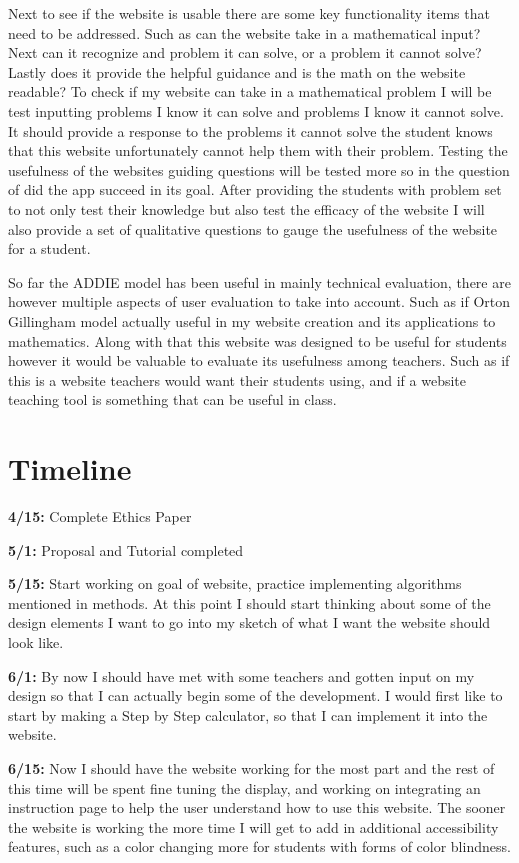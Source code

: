 \documentclass[10pt,twocolumn]{article}
\begin{document}
Next to see if the website is usable there are some key functionality items that need to be addressed. Such as can the website take in a mathematical input? Next can it recognize and problem it can solve, or a problem it cannot solve? Lastly does it provide the helpful guidance and is the math on the website readable? To check if my website can take in a mathematical problem I will be test inputting problems I know it can solve and problems I know it cannot solve. It should provide a response to the problems it cannot solve the student knows that this website unfortunately cannot help them with their problem. Testing the usefulness of the websites guiding questions will be tested more so in the question of did the app succeed in its goal. After providing the students with problem set to not only test their knowledge but also test the efficacy of the website I will also provide a set of qualitative questions to gauge the usefulness of the website for a student.

So far the ADDIE model has been useful in mainly technical evaluation, there are however multiple aspects of user evaluation to take into account. Such as if Orton Gillingham model actually useful in my website creation and its applications to mathematics. Along with that this website was designed to be useful for students however it would be valuable to evaluate its usefulness among teachers. Such as if this is a website teachers would want their students using, and if a website teaching tool is something that can be useful in class.

\section{Timeline}

\textbf{4/15:} 
Complete Ethics Paper

\textbf{5/1:} 
Proposal and Tutorial completed

\textbf{5/15:}  
Start working on goal of website, practice implementing algorithms mentioned in methods. At this point I should start thinking about some of the design elements I want to go into my sketch of what I want the website should look like. 

\textbf{6/1:} 
By now I should have met with some teachers and gotten input on my design so that I can actually begin some of the development. I would first like to start by making a Step by Step calculator, so that I can implement it into the website.

\textbf{6/15:}  
Now I should have the website working for the most part and the rest of this time will be spent fine tuning the display, and working on integrating an instruction page to help the user understand how to use this website. The sooner the website is working the more time I will get to add in additional accessibility features, such as a color changing more for students with forms of color blindness.
\end{document}
